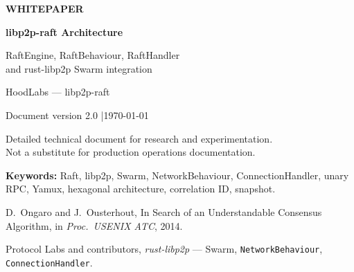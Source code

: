 \documentclass[11pt,a4paper]{article}
\newcommand{\WhitepaperTitlePage}{%
  \begin{titlepage}
    \centering
    \vspace*{1.2cm}
    {\LARGE\bfseries\color{brand} WHITEPAPER\par}
    \vspace{0.5cm}
    {\Huge\bfseries libp2p-raft Architecture\par}
    \vspace{0.35cm}
    {\Large RaftEngine, RaftBehaviour, RaftHandler\\and rust-libp2p Swarm integration\par}
    \vspace{1.8cm}
    {\large HoodLabs --- libp2p-raft\par}
    \vspace{0.25cm}
    {\normalsize\textcolor{muted}{Document version 2.0 \quad|\quad \today}\par}
    \vfill
    {\small\textcolor{muted}%
      Detailed technical document for research and experimentation.\\
      Not a substitute for production operations documentation.\par}
    \vspace{0.8cm}
  \end{titlepage}
}
\begin{document}
\WhitepaperTitlePage

\begin{abstract}
\noindent
This whitepaper describes the \textbf{complete architecture} of the \texttt{libp2p-raft} crate:
how a Raft state machine is embedded into rust-libp2p through the \texttt{NetworkBehaviour} /
\texttt{ConnectionHandler} model, module boundaries, runtime data structures, event contracts,
election/replication/inbound-outbound RPC flows, the wire specification, the failure matrix,
storage and snapshots, and the event-driven execution model. The content tracks the source in
\texttt{src/behaviour.rs}, \texttt{src/handler.rs}, \texttt{src/raft/engine.rs},
\texttt{src/protocol/} and \texttt{src/storage/}.
\end{abstract}

\noindent\textbf{Keywords:} Raft, libp2p, Swarm, NetworkBehaviour, ConnectionHandler,
unary RPC, Yamux, hexagonal architecture, correlation ID, snapshot.

\tableofcontents
\newpage








\begin{thebibliography}{9}
D.~Ongaro and J.~Ousterhout,
\newblock In Search of an Understandable Consensus Algorithm,
\newblock in \emph{Proc.\ USENIX ATC}, 2014.

Protocol Labs and contributors,
\newblock \emph{rust-libp2p} --- Swarm, \texttt{NetworkBehaviour},
\texttt{ConnectionHandler}.
\end{thebibliography}
\end{document}
